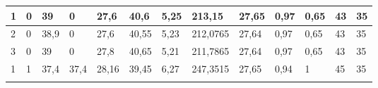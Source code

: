 \begin{table}[H]
{\begin{tabular}{|l|llll|lll|ll|l|ll|}
\rowcolor[HTML]{E2EFDA} 
1             & \multicolumn{1}{l|}{\cellcolor[HTML]{E2EFDA}0}                & \multicolumn{1}{l|}{\cellcolor[HTML]{E2EFDA}39}               & \multicolumn{1}{l|}{\cellcolor[HTML]{E2EFDA}0}                & 27,6              & \multicolumn{1}{l|}{\cellcolor[HTML]{E2EFDA}40,6}              & \multicolumn{1}{l|}{\cellcolor[HTML]{E2EFDA}5,25}              & 213,15            & \multicolumn{1}{l|}{\cellcolor[HTML]{E2EFDA}27,65}            & 0,97             & 0,65                      & \multicolumn{1}{l|}{\cellcolor[HTML]{E2EFDA}43}                  & 35               \\ \hline
\rowcolor[HTML]{C6E0B4} 
2             & \multicolumn{1}{l|}{\cellcolor[HTML]{C6E0B4}0}                & \multicolumn{1}{l|}{\cellcolor[HTML]{C6E0B4}38,9}             & \multicolumn{1}{l|}{\cellcolor[HTML]{C6E0B4}0}                & 27,6              & \multicolumn{1}{l|}{\cellcolor[HTML]{C6E0B4}40,55}             & \multicolumn{1}{l|}{\cellcolor[HTML]{C6E0B4}5,23}              & 212,0765          & \multicolumn{1}{l|}{\cellcolor[HTML]{C6E0B4}27,64}            & 0,97             & 0,65                      & \multicolumn{1}{l|}{\cellcolor[HTML]{C6E0B4}43}                  & 35               \\ \hline
\rowcolor[HTML]{E2EFDA} 
3             & \multicolumn{1}{l|}{\cellcolor[HTML]{E2EFDA}0}                & \multicolumn{1}{l|}{\cellcolor[HTML]{E2EFDA}39}               & \multicolumn{1}{l|}{\cellcolor[HTML]{E2EFDA}0}                & 27,8              & \multicolumn{1}{l|}{\cellcolor[HTML]{E2EFDA}40,65}             & \multicolumn{1}{l|}{\cellcolor[HTML]{E2EFDA}5,21}              & 211,7865          & \multicolumn{1}{l|}{\cellcolor[HTML]{E2EFDA}27,64}            & 0,97             & 0,65                      & \multicolumn{1}{l|}{\cellcolor[HTML]{E2EFDA}43}                  & 35               \\ \hline
\rowcolor[HTML]{C6E0B4} 
1             & \multicolumn{1}{l|}{\cellcolor[HTML]{C6E0B4}1}                & \multicolumn{1}{l|}{\cellcolor[HTML]{C6E0B4}37,4}             & \multicolumn{1}{l|}{\cellcolor[HTML]{C6E0B4}37,4}             & 28,16             & \multicolumn{1}{l|}{\cellcolor[HTML]{C6E0B4}39,45}             & \multicolumn{1}{l|}{\cellcolor[HTML]{C6E0B4}6,27}              & 247,3515          & \multicolumn{1}{l|}{\cellcolor[HTML]{C6E0B4}27,65}            & 0,94             & 1                         & \multicolumn{1}{l|}{\cellcolor[HTML]{C6E0B4}45}                  & 35               \\ \hline
\rowcolor[HTML]{E2EFDA} 

\end{tabular}}
\end{table}
